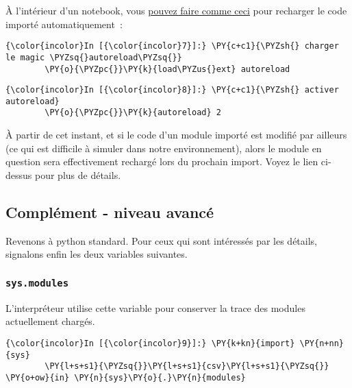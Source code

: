 À l'intérieur d'un notebook, vous
\href{https://ipython.org/ipython-doc/3/config/extensions/autoreload.html}{pouvez
faire comme ceci} pour recharger le code importé automatiquement~:

    \begin{Verbatim}[commandchars=\\\{\}]
{\color{incolor}In [{\color{incolor}7}]:} \PY{c+c1}{\PYZsh{} charger le magic \PYZsq{}autoreload\PYZsq{}}
        \PY{o}{\PYZpc{}}\PY{k}{load\PYZus{}ext} autoreload
\end{Verbatim}


    \begin{Verbatim}[commandchars=\\\{\}]
{\color{incolor}In [{\color{incolor}8}]:} \PY{c+c1}{\PYZsh{} activer autoreload}
        \PY{o}{\PYZpc{}}\PY{k}{autoreload} 2
\end{Verbatim}


    À partir de cet instant, et si le code d'un module importé est modifié
par ailleurs (ce qui est difficile à simuler dans notre environnement),
alors le module en question sera effectivement rechargé lors du prochain
import. Voyez le lien ci-dessus pour plus de détails.

    \hypertarget{compluxe9ment---niveau-avancuxe9}{%
\subsection{Complément - niveau
avancé}\label{compluxe9ment---niveau-avancuxe9}}

    Revenons à python standard. Pour ceux qui sont intéressés par les
détails, signalons enfin les deux variables suivantes.

    \hypertarget{sys.modules}{%
\subsubsection{\texorpdfstring{\texttt{sys.modules}}{sys.modules}}\label{sys.modules}}

    L'interpréteur utilise cette variable pour conserver la trace des
modules actuellement chargés.

    \begin{Verbatim}[commandchars=\\\{\}]
{\color{incolor}In [{\color{incolor}9}]:} \PY{k+kn}{import} \PY{n+nn}{sys}
        \PY{l+s+s1}{\PYZsq{}}\PY{l+s+s1}{csv}\PY{l+s+s1}{\PYZsq{}} \PY{o+ow}{in} \PY{n}{sys}\PY{o}{.}\PY{n}{modules}
\end{Verbatim}


